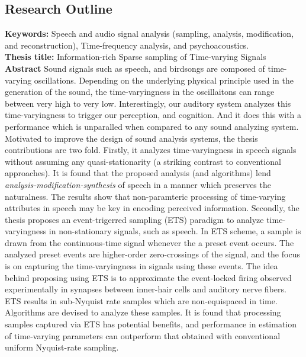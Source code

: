 \documentclass[line]{resume}
\begin{document}
{\begin{resume}
     \section{\mysidestyle Research Outline}
     \vspace{1mm}
     \textbf{Keywords:} Speech and audio signal analysis (sampling, analysis, modification, and reconstruction),
     Time-frequency analysis, and psychoacoustics.\\
     \textbf{Thesis title:} Information-rich Sparse sampling of Time-varying Signals\\
     \newline\noindent\textbf{Abstract} Sound signals such as speech, and birdsongs are composed of time-varying oscillations.
     Depending on the underlying physical principle used in the generation of the sound, the time-varyingness in the oscillaitons
     can range between very high to very low.
     Interestingly, our auditory system analyzes this time-varyingness to trigger our perception, and cognition.
     And it does this with a performance which is unparalled when compared to any sound analyzing system.
     Motivated to improve the design of sound analysis systems, the thesis contributions are two fold.
     Firstly, it analyzes time-varyingness in speech signals without assuming any quasi-stationarity (a striking contrast to
     conventional approaches). It is found that the proposed analysis (and algorithms) lend \textit{analysis-modification-synthesis} of speech
     in a manner which preserves the naturalness. The results show that non-paramteric processing of time-varying attributes in speech
     may be key in encoding perceived information.
     Secondly, the thesis proposes an event-trigerred sampling (ETS) paradigm to analyze time-varyingness in non-stationary signals, such as speech.
     In ETS scheme, a sample is drawn from the continuous-time signal whenever the a preset event occurs.
     The analyzed preset events are higher-order zero-crossings of the signal, and the focus is on capturing the time-varyingness
     in signals using these events.
     The idea behind proposing using ETS is to approximate the event-locked firing observed experimentally in synapses between inner-hair cells and auditory nerve fibers.
     ETS results in sub-Nyquist rate samples which are non-equispaced in time. Algorithms are devised to analyze these samples.
     It is found that processing samples captured via ETS has potential benefits, and performance in estimation of time-varying parameters can
     outperform that obtained with conventional uniform Nyquist-rate sampling.

\end{resume}}
\end{document}
